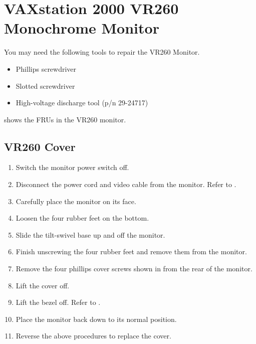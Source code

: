 \section{VAXstation 2000 VR260 Monochrome Monitor}

You may need the following tools to repair the VR260 Monitor.

\begin{itemize}
\item	Phillips screwdriver
\item	Slotted screwdriver
\item	High-voltage discharge tool (p/n 29-24717)
\end{itemize}

 shows the FRUs in the VR260 monitor.

\newpage

\subsection{VR260 Cover}

\begin{enumerate}

\item	Switch the monitor power switch off.

\item	Disconnect the power cord and video cable from the monitor. Refer to .


\item	Carefully place the monitor on its face.

\item	Loosen the four rubber feet on the bottom.

\item	Slide the tilt-swivel base up and off the monitor.

\item	Finish unscrewing the four rubber feet and remove them from the monitor.

\newpage

\item	Remove the four phillips cover screws shown in  from the rear of the monitor.


\item	Lift the cover off.

\newpage

\item	Lift the bezel off. Refer to .


\item	Place the monitor back down to its normal position.

\item	Reverse the above procedures to replace the cover.

\end{enumerate}
